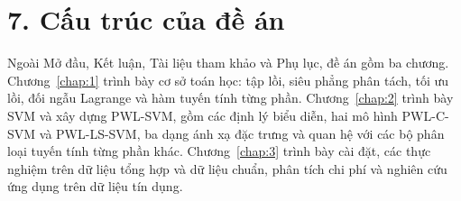 \section*{7. Cấu trúc của đề án}

Ngoài Mở đầu, Kết luận, Tài liệu tham khảo và Phụ lục, đề án gồm ba chương. Chương~\ref{chap:1} trình bày cơ sở toán học: tập lồi, siêu phẳng phân tách, tối ưu lồi, đối ngẫu Lagrange và hàm tuyến tính từng phần. Chương~\ref{chap:2} trình bày SVM và xây dựng PWL-SVM, gồm các định lý biểu diễn, hai mô hình PWL-C-SVM và PWL-LS-SVM, ba dạng ánh xạ đặc trưng và quan hệ với các bộ phân loại tuyến tính từng phần khác. Chương~\ref{chap:3} trình bày cài đặt, các thực nghiệm trên dữ liệu tổng hợp và dữ liệu chuẩn, phân tích chi phí và nghiên cứu ứng dụng trên dữ liệu tín dụng.
